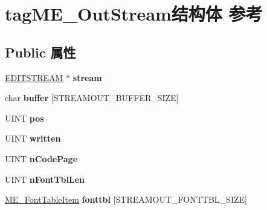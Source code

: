 \hypertarget{structtag_m_e___out_stream}{}\section{tag\+M\+E\+\_\+\+Out\+Stream结构体 参考}
\label{structtag_m_e___out_stream}
\subsection*{Public 属性}
\begin{DoxyCompactItemize}
\item 
\mbox{\label{structtag_m_e___out_stream_a323ccbd0370236ff5a37276764d8cfaa}} 
\hyperlink{struct__editstream}{E\+D\+I\+T\+S\+T\+R\+E\+AM} $\ast$ {\bfseries stream}
\item 
\mbox{\label{structtag_m_e___out_stream_aef600170a8612b47b5e949e540e5eebe}} 
char {\bfseries buffer} \mbox{[}S\+T\+R\+E\+A\+M\+O\+U\+T\+\_\+\+B\+U\+F\+F\+E\+R\+\_\+\+S\+I\+ZE\mbox{]}
\item 
\mbox{\label{structtag_m_e___out_stream_ad34e3b3f7d9d0fd6fb9d647f1c1ce751}} 
U\+I\+NT {\bfseries pos}
\item 
\mbox{\label{structtag_m_e___out_stream_a735edcec1b9d8a8807198fcfc8acceef}} 
U\+I\+NT {\bfseries written}
\item 
\mbox{\label{structtag_m_e___out_stream_ac02b0af515d4bcfbf409c68695fbeabc}} 
U\+I\+NT {\bfseries n\+Code\+Page}
\item 
\mbox{\label{structtag_m_e___out_stream_a4d62d41eaa34fbbffa7a082359370e12}} 
U\+I\+NT {\bfseries n\+Font\+Tbl\+Len}
\item 
\mbox{\label{structtag_m_e___out_stream_a763ba05cd63b3684876d9251bbc9518a}} 
\hyperlink{structtag_m_e___font_table_item}{M\+E\+\_\+\+Font\+Table\+Item} {\bfseries fonttbl} \mbox{[}S\+T\+R\+E\+A\+M\+O\+U\+T\+\_\+\+F\+O\+N\+T\+T\+B\+L\+\_\+\+S\+I\+ZE\mbox{]}
\item 
\mbox{\label{structtag_m_e___out_stream_aee208a0abb50bebef45ec525f4b39804}} 

\end{DoxyCompactItemize}
